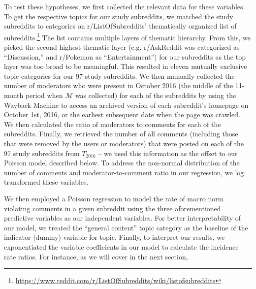 To test these hypotheses, we first collected the relevant data for these variables. To get the respective topics for our study subreddits, we matched the study subreddits to categories on r/ListOfSubreddits’ thematically organized list of subreddits.\footnote{\url{https://www.reddit.com/r/ListOfSubreddits/wiki/listofsubreddits}} The list contains multiple layers of thematic hierarchy. From this, we picked the second-highest thematic layer (e.g. r/AskReddit was categorized as “Discussion,” and r/Pokemon as “Entertainment”) for our subreddits as the top layer was too broad to be meaningful. This resulted in eleven mutually exclusive topic categories for our 97 study subreddits.  We then manually collected the number of moderators who were present in October 2016 (the middle of the 11-month period when $\mathcal{M}$ was collected) for each of the subreddits by using the Wayback Machine to access an archived version of each subreddit's homepage on October 1st, 2016, or the earliest subsequent date when the page was crawled. We then calculated the ratio of moderators to comments for each of the subreddits. Finally, we retrieved the number of all comments (including those that were removed by the users or moderators) that were posted on each of the 97 study subreddits from $T_{2016}$ -- we used this information as the offset to our Poisson model described below. To address the non-normal distribution of the number of comments and moderator-to-comment ratio in our regression, we log transformed these variables.

We then employed a Poisson regression \cite{63_poisson} to model the rate of macro norm violating comments in a given subreddit using the three aforementioned predictive variables as our independent variables.  For better interpretability of our model, we treated the ``general content'' topic category as the baseline of the indicator (dummy) variable for topic. Finally, to interpret our results, we exponentiated the variable coefficients in our model to calculate the incidence rate ratios. For instance, as we will cover in the next section, 


